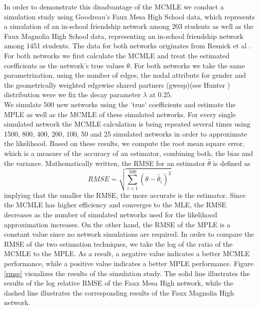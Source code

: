 \documentclass[headsepline=true, abstracton]{scrartcl}
\begin{document}
\noindent In order to demonstrate this disadvantage of the MCMLE we conduct a simulation study using Goodreau's Faux Mesa High School data, which represents a simulation of an in-school friendship network among 203 students as well as the Faux Magnolia High School data, representing an in-school friendship network among 1451 students. The data for both networks originates from Resnick et al \cite{Resnicketal1997}.\\[0.3cm]
For both networks we first calculate the MCMLE and treat the estimated coefficients as the network's true values $\theta$. For both networks we take the same parametrization, using the number of edges, the nodal attribute for gender and the geometrically weighted edgewise shared partners (gwesp)(see Hunter \cite{Hunter.2006}) distribution were we fix the decay parameter $\lambda$ at $0.25$.\\
We simulate 500 new networks using the 'true' coefficients and estimate the MPLE as well as the MCMLE of these simulated networks. For every single simulated network the MCMLE calculation is being repeated several times using 1500, 800, 400, 200, 100, 50 and 25 simulated networks in order to approximate the likelihood.
Based on these results, we compute the root mean square error, which is a measure of the accuracy of an estimator, combining both, the bias and the variance. Mathematically written, the RMSE for an estimator $\hat{\theta}$ is defined as 
$$RMSE = \sqrt{\sum_{i=1}^{500}(\theta - \hat{\theta}_i)^2}$$
implying that the smaller the RMSE, the more accurate is the estimator. Since the MCMLE has higher efficiency and converges to the MLE, the RMSE decreases as the number of simulated networks used for the likelihood approximation increases. On the other hand, the RMSE of the MPLE is a constant value since no network simulations are required. In order to compare the RMSE of the two estimation techniques, we take the log of the ratio of the MCMLE to the MPLE. As a result, a negative value indicates a better MCMLE performance, while a positive value indicates a better MPLE performance. Figure \ref{rmse} visualizes the results of the simulation study. The solid line illustrates the results of the log relative RMSE of the Faux Mesa High network, while the dashed line illustrates the corresponding results of the Faux Magnolia High network. 
\end{document}
